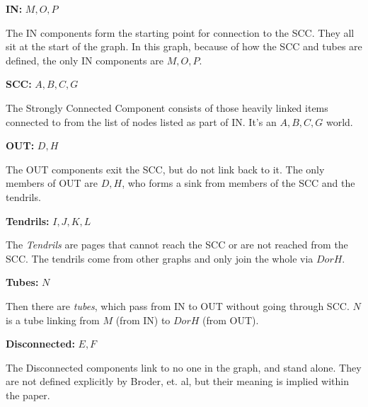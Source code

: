 \textbf{IN:}  $M,O,P$

The IN components form the starting point for connection to the SCC\cite{broder2000}.  They all sit at the start of the graph.  In this graph, because of how the SCC and tubes are defined, the only IN components are $M,O,P$.

\textbf{SCC:}  $A, B, C, G$

The Strongly Connected Component consists of those heavily linked items connected to from the list of nodes listed as part of IN\cite{broder2000}.  It's an $A, B, C, G$ world.

\textbf{OUT:}  $D,H$

The OUT components exit the SCC, but do not link back to it\cite{broder2000}.  The only members of OUT are $D,H$, who forms a sink from members of the SCC and the tendrils.

\textbf{Tendrils:}  $I, J, K, L$

The \emph{Tendrils} are pages that cannot reach the SCC or are not reached from the SCC\cite{broder2000}.  The tendrils come from other graphs and only join the whole via $D or H$.

\textbf{Tubes:} $N$

Then there are \emph{tubes}, which pass from IN to OUT without going through SCC\cite{broder2000}.  $N$ is a tube linking from $M$ (from IN) to $D or H$ (from OUT).

\textbf{Disconnected:}  $E, F$

The Disconnected components link to no one in the graph, and stand alone.  They are not defined explicitly by Broder, et. al, but their meaning is implied within the paper.

